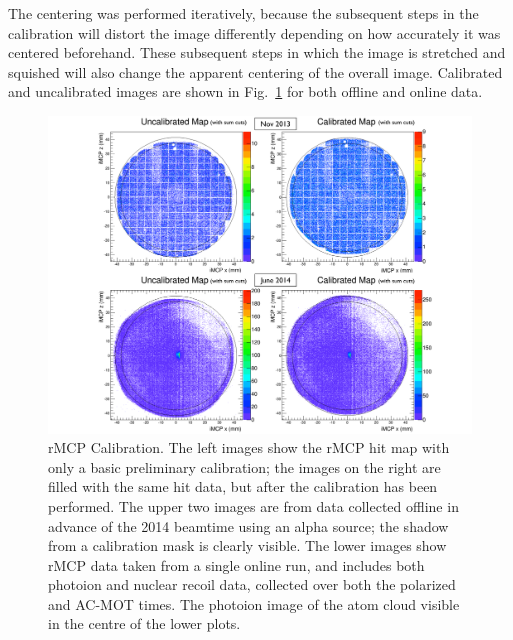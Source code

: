 The centering was performed iteratively, because the subsequent steps in the calibration will distort the image differently depending on how accurately it was centered beforehand.  These subsequent steps in which the image is stretched and squished will also change the apparent centering of the overall image.  Calibrated and uncalibrated images are shown in Fig.~\ref{fig:rmcp_calibration} for both offline and online data.


\begin{figure}[h!tb]
	\centering
	\includegraphics[width=.999\linewidth]
	{Figures/rMCP_Calibration}
	\caption[rMCP Calibration]{rMCP Calibration.  The left images show the rMCP hit map with only a basic preliminary calibration; the images on the right are filled with the same hit data, but after the calibration has been performed.  The upper two images are from data collected offline in advance of the 2014 beamtime using an alpha source; the shadow from a calibration mask is clearly visible.  The lower images show rMCP data taken from a single online run, and includes both photoion and nuclear recoil data, collected over both the polarized and AC-MOT times.  The photoion image of the atom cloud visible in the centre of the lower plots.}
	\label{fig:rmcp_calibration}
\end{figure}

